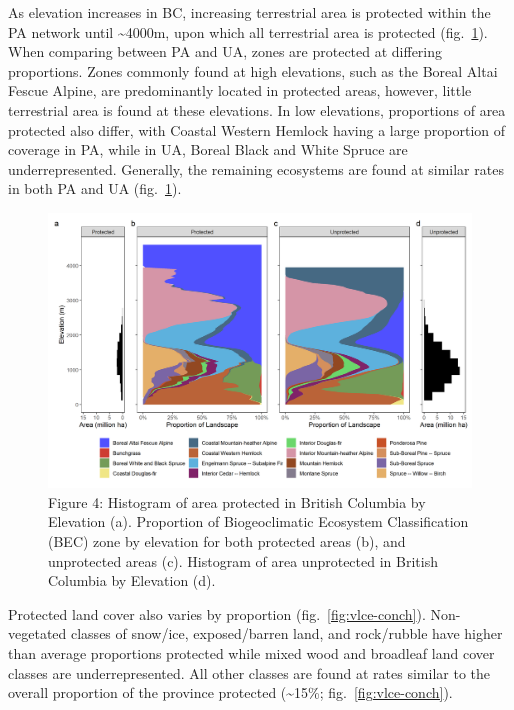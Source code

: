 \documentclass[10pt,oneside]{article}
\makeatletter
\def\maxwidth{\ifdim\Gin@nat@width>\linewidth\linewidth
\else\Gin@nat@width\fi}
\let\Oldincludegraphics\includegraphics
\renewcommand{\includegraphics}[1]{\Oldincludegraphics[width=\maxwidth]{#1}}
\makeatother
\begin{document}
As elevation increases in BC, increasing terrestrial area is protected
within the PA network until \textasciitilde4000m, upon which all
terrestrial area is protected (fig.~\ref{fig:bec-elev}). When comparing
between PA and UA, zones are protected at differing proportions. Zones
commonly found at high elevations, such as the Boreal Altai Fescue
Alpine, are predominantly located in protected areas, however, little
terrestrial area is found at these elevations. In low elevations,
proportions of area protected also differ, with Coastal Western Hemlock
having a large proportion of coverage in PA, while in UA, Boreal Black
and White Spruce are underrepresented. Generally, the remaining
ecosystems are found at similar rates in both PA and UA
(fig.~\ref{fig:bec-elev}).

\begin{figure}
\hypertarget{fig:bec-elev}{%
\centering
\includegraphics{figures/bec_elev_hist.png}
\caption{Figure 4: Histogram of area protected in British Columbia by
Elevation (a). Proportion of Biogeoclimatic Ecosystem Classification
(BEC) zone by elevation for both protected areas (b), and unprotected
areas (c). Histogram of area unprotected in British Columbia by
Elevation (d).}\label{fig:bec-elev}
}
\end{figure}

Protected land cover also varies by proportion
(fig.~\ref{fig:vlce-conch}). Non-vegetated classes of snow/ice,
exposed/barren land, and rock/rubble have higher than average
proportions protected while mixed wood and broadleaf land cover classes
are underrepresented. All other classes are found at rates similar to
the overall proportion of the province protected (\textasciitilde15\%;
fig.~\ref{fig:vlce-conch}).
\end{document}
